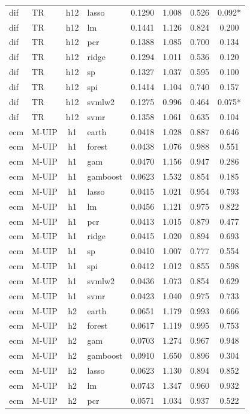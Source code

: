 \begin{ThreePartTable}
\begin{longtable}[t]{llclcccc}
dif & TR & h12 & lasso & 0.1290 & 1.008 & 0.526 & 0.092*\\
dif & TR & h12 & lm & 0.1441 & 1.126 & 0.824 & 0.200\\
dif & TR & h12 & pcr & 0.1388 & 1.085 & 0.700 & 0.134\\
dif & TR & h12 & ridge & 0.1294 & 1.011 & 0.536 & 0.120\\
dif & TR & h12 & sp & 0.1327 & 1.037 & 0.595 & 0.100\\
dif & TR & h12 & spi & 0.1414 & 1.104 & 0.740 & 0.157\\
dif & TR & h12 & svmlw2 & 0.1275 & 0.996 & 0.464 & 0.075*\\
dif & TR & h12 & svmr & 0.1358 & 1.061 & 0.635 & 0.104\\
\addlinespace
ecm & M-UIP & h1 & earth & 0.0418 & 1.028 & 0.887 & 0.646\\
ecm & M-UIP & h1 & forest & 0.0438 & 1.076 & 0.988 & 0.551\\
ecm & M-UIP & h1 & gam & 0.0470 & 1.156 & 0.947 & 0.286\\
ecm & M-UIP & h1 & gamboost & 0.0623 & 1.532 & 0.854 & 0.185\\
ecm & M-UIP & h1 & lasso & 0.0415 & 1.021 & 0.954 & 0.793\\
ecm & M-UIP & h1 & lm & 0.0456 & 1.121 & 0.975 & 0.822\\
ecm & M-UIP & h1 & pcr & 0.0413 & 1.015 & 0.879 & 0.477\\
ecm & M-UIP & h1 & ridge & 0.0415 & 1.020 & 0.894 & 0.693\\
ecm & M-UIP & h1 & sp & 0.0410 & 1.007 & 0.777 & 0.554\\
ecm & M-UIP & h1 & spi & 0.0412 & 1.012 & 0.855 & 0.598\\
ecm & M-UIP & h1 & svmlw2 & 0.0436 & 1.073 & 0.854 & 0.629\\
ecm & M-UIP & h1 & svmr & 0.0423 & 1.040 & 0.975 & 0.733\\
\addlinespace
ecm & M-UIP & h2 & earth & 0.0651 & 1.179 & 0.993 & 0.666\\
ecm & M-UIP & h2 & forest & 0.0617 & 1.119 & 0.995 & 0.753\\
ecm & M-UIP & h2 & gam & 0.0703 & 1.274 & 0.967 & 0.948\\
ecm & M-UIP & h2 & gamboost & 0.0910 & 1.650 & 0.896 & 0.304\\
ecm & M-UIP & h2 & lasso & 0.0623 & 1.130 & 0.894 & 0.852\\
ecm & M-UIP & h2 & lm & 0.0743 & 1.347 & 0.960 & 0.932\\
ecm & M-UIP & h2 & pcr & 0.0571 & 1.034 & 0.937 & 0.522\\

\end{longtable}
\end{ThreePartTable}
